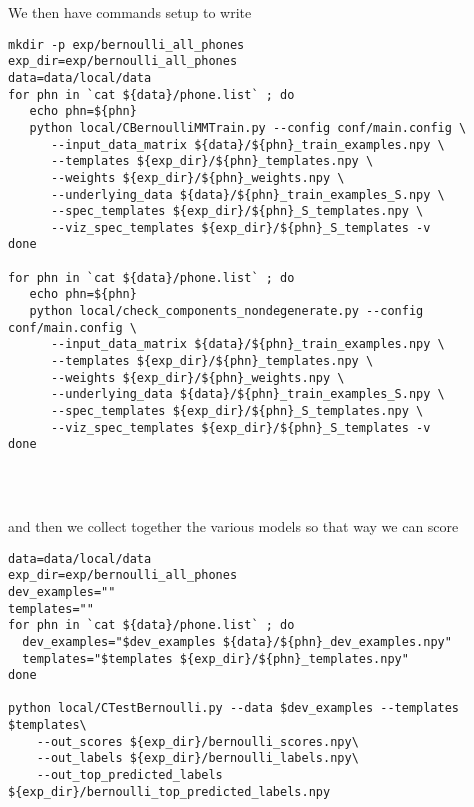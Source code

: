 \documentclass{article}
\begin{document}
We then have commands setup to write
\begin{verbatim}
mkdir -p exp/bernoulli_all_phones
exp_dir=exp/bernoulli_all_phones
data=data/local/data
for phn in `cat ${data}/phone.list` ; do
   echo phn=${phn}
   python local/CBernoulliMMTrain.py --config conf/main.config \
      --input_data_matrix ${data}/${phn}_train_examples.npy \
      --templates ${exp_dir}/${phn}_templates.npy \
      --weights ${exp_dir}/${phn}_weights.npy \
      --underlying_data ${data}/${phn}_train_examples_S.npy \
      --spec_templates ${exp_dir}/${phn}_S_templates.npy \
      --viz_spec_templates ${exp_dir}/${phn}_S_templates -v
done

for phn in `cat ${data}/phone.list` ; do
   echo phn=${phn}
   python local/check_components_nondegenerate.py --config conf/main.config \
      --input_data_matrix ${data}/${phn}_train_examples.npy \
      --templates ${exp_dir}/${phn}_templates.npy \
      --weights ${exp_dir}/${phn}_weights.npy \
      --underlying_data ${data}/${phn}_train_examples_S.npy \
      --spec_templates ${exp_dir}/${phn}_S_templates.npy \
      --viz_spec_templates ${exp_dir}/${phn}_S_templates -v
done




\end{verbatim}

and then we collect together the various models so that way
we can score

\begin{verbatim}
data=data/local/data
exp_dir=exp/bernoulli_all_phones
dev_examples=""
templates=""
for phn in `cat ${data}/phone.list` ; do
  dev_examples="$dev_examples ${data}/${phn}_dev_examples.npy"
  templates="$templates ${exp_dir}/${phn}_templates.npy"
done

python local/CTestBernoulli.py --data $dev_examples --templates $templates\
    --out_scores ${exp_dir}/bernoulli_scores.npy\
    --out_labels ${exp_dir}/bernoulli_labels.npy\
    --out_top_predicted_labels ${exp_dir}/bernoulli_top_predicted_labels.npy


\end{verbatim}
\end{document}
